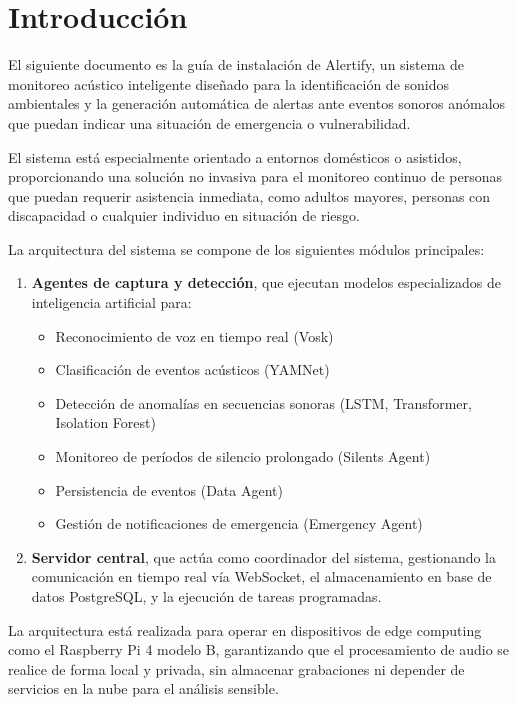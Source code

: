 
\section*{Introducción}

El siguiente documento es la guía de instalación de Alertify, un sistema de monitoreo acústico inteligente diseñado para la identificación de sonidos ambientales y la generación automática de alertas ante eventos sonoros anómalos que puedan indicar una situación de emergencia o vulnerabilidad.

El sistema está especialmente orientado a entornos domésticos o asistidos, proporcionando una solución no invasiva para el monitoreo continuo de personas que puedan requerir asistencia inmediata, como adultos mayores, personas con discapacidad o cualquier individuo en situación de riesgo.

La arquitectura del sistema se compone de los siguientes módulos principales:

\begin{enumerate}
  \item \textbf{Agentes de captura y detección}, que ejecutan modelos especializados de inteligencia artificial para:
        \begin{itemize}
          \item Reconocimiento de voz en tiempo real (Vosk)
          \item Clasificación de eventos acústicos (YAMNet)
          \item Detección de anomalías en secuencias sonoras (LSTM, Transformer, Isolation Forest)
          \item Monitoreo de períodos de silencio prolongado (Silents Agent)
          \item Persistencia de eventos (Data Agent)
          \item Gestión de notificaciones de emergencia (Emergency Agent)
        \end{itemize}
  \item \textbf{Servidor central}, que actúa como coordinador del sistema, gestionando la comunicación en tiempo real vía WebSocket, el almacenamiento en base de datos PostgreSQL, y la ejecución de tareas programadas.
\end{enumerate}

La arquitectura está realizada para operar en dispositivos de edge computing como el Raspberry Pi 4 modelo B, garantizando que el procesamiento de audio se realice de forma local y privada, sin almacenar grabaciones ni depender de servicios en la nube para el análisis sensible.

